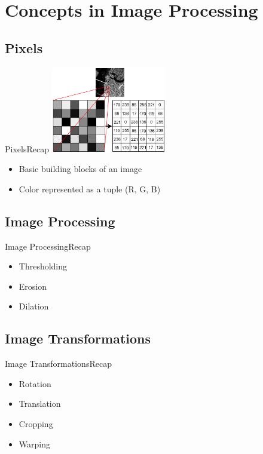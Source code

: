 \documentclass{beamer}
\begin{document}
\section{Concepts in Image Processing}
\subsection{Pixels}

\begin{frame}{Pixels}{Recap}
\centering
    \includegraphics[width=50mm]{winter1/pixel.png} 

\begin{itemize}
\item Basic building blocks of an image
\item Color represented as a tuple (R, G, B)
\end{itemize}
\end{frame}

\subsection{Image Processing}
\begin{frame}{Image Processing}{Recap}
\begin{itemize}
\item Thresholding
\pause
\item Erosion
\pause
\item Dilation
\end{itemize}
\end{frame}

\subsection{Image Transformations}
\begin{frame}{Image Transformations}{Recap}
\begin{itemize}
\item Rotation
\pause
\item Translation
\pause
\item Cropping
\pause
\item Warping
\end{itemize}
\end{frame}
\end{document}
